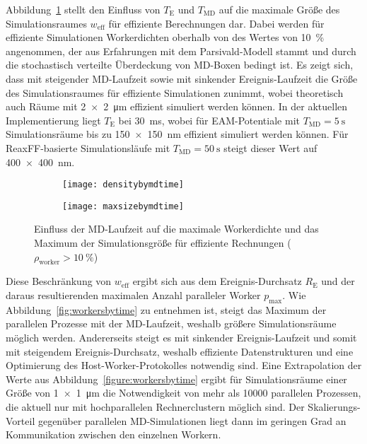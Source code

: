 Abbildung~\ref{fig:densitymaxsize} stellt den Einfluss von $T_\text{E}$ und $T_\text{MD}$ auf die maximale Größe des Simulationsraumes $w_\text{eff}$ für effiziente Berechnungen dar.
Dabei werden für effiziente Simulationen Workerdichten oberhalb von des Wertes von \SI{10}{\percent} angenommen, der aus Erfahrungen mit dem Parsivald-Modell stammt und durch die stochastisch verteilte Überdeckung von MD-Boxen bedingt ist.
Es zeigt sich, dass mit steigender MD-Laufzeit sowie mit sinkender Ereignis-Laufzeit die Größe des Simulationsraumes für effiziente Simulationen zunimmt, wobei theoretisch auch Räume mit \SI{2x2}{\micro\meter} effizient simuliert werden können.
In der aktuellen Implementierung liegt $T_\text{E}$ bei \SI{30}{\milli\second}, wobei für EAM-Potentiale mit $T_\text{MD}=\SI{5}{\second}$ Simulationsräume bis zu \SI{150x150}{\nano\meter} effizient simuliert werden können.
Für ReaxFF-basierte Simulationsläufe mit $T_\text{MD}=\SI{50}{\second}$ steigt dieser Wert auf \SI{400x400}{\nano\meter}.

\begin{figure}[p]
  \captionsetup[subfigure]{singlelinecheck=false}
  \def\subfigwidth{7cm}
  \begin{subfigure}[t]{\subfigwidth}
    \texttt{[image: densitybymdtime]}
  \end{subfigure}
  \hfill
  \begin{subfigure}[t]{\subfigwidth}
    \texttt{[image: maxsizebymdtime]}
  \end{subfigure}

  \caption{Einfluss der MD-Laufzeit auf die maximale Workerdichte und das Maximum der Simulationsgröße für effiziente Rechnungen ($\rho_\text{worker} > \SI{10}{\percent}$)}
  \label{fig:densitymaxsize}

\end{figure}

Diese Beschränkung von $w_\text{eff}$ ergibt sich aus dem Ereignis-Durchsatz $R_\text{E}$ und der daraus resultierenden maximalen Anzahl paralleler Worker $p_\text{max}$.\continuehere
Wie Abbildung~\ref{fig:workersbytime} zu entnehmen ist, steigt das Maximum der parallelen Prozesse mit der MD-Laufzeit, weshalb größere Simulationsräume möglich werden.
Andererseits steigt es mit sinkender Ereignis-Laufzeit und somit mit steigendem Ereignis-Durchsatz, weshalb effiziente Datenstrukturen und eine Optimierung des Host-Worker-Protokolles notwendig sind.
Eine Extrapolation der Werte aus Abbildung~\ref{figure:workersbytime} ergibt für Simulationsräume einer Größe von \SI{1x1}{\micro\meter} die Notwendigkeit von mehr als \num{10000} parallelen Prozessen, die aktuell nur mit hochparallelen Rechnerclustern möglich sind.
Der Skalierungs-Vorteil gegenüber parallelen MD-Simulationen liegt dann im geringen Grad an Kommunikation zwischen den einzelnen Workern.

